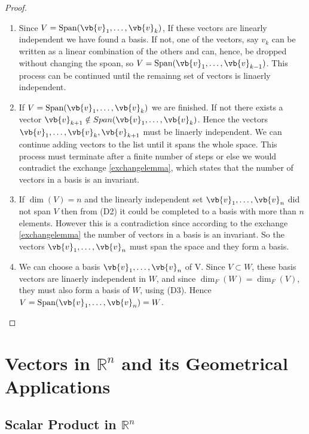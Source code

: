 \documentclass[a4paper,12pt]{report}
\begin{document}
\begin{proof}

\begin{enumerate}[label=(D\arabic*)] 
    \item Since \(V = \text{Span}(\vb{v}_{1}, \ldots, \vb{v}_k ) \), If these vectors are linearly independent we have found a basis. If not, one of the vectors, say \(v_{k} \) can be written as a linear combination of the others and can, hence, be dropped without changing the spoan, so \(V = \text{Span}(\vb{v}_{1}, \ldots, \vb{v}_{k-1}) \). This process can be continued until the remainng set of vectors is linaerly independent.
    \item If \(V= \text{Span}(\vb{v}_{1}, \ldots, \vb{v}_k) \) we are finished. If not there exists a vector \(\vb{v} _{k+1} \notin Span(\vb{v}_{1}, \ldots, \vb{v}_k) \). Hence the vectors \(\vb{v}_{1}, \ldots, \vb{v}_k, \vb{v} _{k+1} \) must be linaerly independent. We can continue adding vectors to the list until it spans the whole space. This process must terminate after a finite number of steps or else we would contradict the exchange \cref{exchangelemma}, which states that the number of vectors in a basis is an invariant.
    \item If \(\dim (V) = n\) and the linearly independent set \(\vb{v}_{1}, \ldots, \vb{v}_n \) did not span \(V\) then from (D2) it could be completed to a basis with more than \(n\) elements. However this is a contradiction since according to the exchange \cref{exchangelemma} the number of vectors in a basis is an invariant. So the vectors \(\vb{v}_{1}, \ldots, \vb{v}_n \) must span the space and they form a basis.
    \item We can choose a basis \(\vb{v}_{1}, \ldots, \vb{v}_n \) of V. Since \(V \subset W\), these basis vectors are linaerly independent in \(W\), and since \(\dim _{F} (W) = \dim _{F} (V)  \), they must also form a basis of \(W\), using (D3). Hence \(V = \text{Span}(\vb{v}_{1}, \ldots, \vb{v}_n ) = W \).         
\end{enumerate}

\end{proof}


\chapter{Vectors in \(\mathbb{R}^{n} \) and its Geometrical Applications }

\section{Scalar Product in \(\mathbb{R}^{n} \) }
\end{document}
